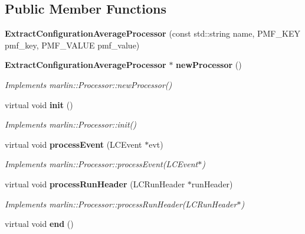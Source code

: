 \subsection*{Public Member Functions}
\begin{DoxyCompactItemize}
\item 
{\bfseries Extract\-Configuration\-Average\-Processor} (const std\-::string name, P\-M\-F\-\_\-\-K\-E\-Y pmf\-\_\-key, P\-M\-F\-\_\-\-V\-A\-L\-U\-E pmf\-\_\-value)\label{classCALICE_1_1ExtractConfigurationAverageProcessor_a8035f64050859ba76161f1432b37b457}

\item 
{\bf Extract\-Configuration\-Average\-Processor} $\ast$ {\bf new\-Processor} ()\label{classCALICE_1_1ExtractConfigurationAverageProcessor_a077ce7a15806f9843796b912eb8fbce7}

\begin{DoxyCompactList}\small\item\em Implements marlin\-::\-Processor\-::new\-Processor() \end{DoxyCompactList}\item 
virtual void {\bf init} ()\label{classCALICE_1_1ExtractConfigurationAverageProcessor_a28b4116dd4ec68e02db2c9f2ee17fc74}

\begin{DoxyCompactList}\small\item\em Implements marlin\-::\-Processor\-::init() \end{DoxyCompactList}\item 
virtual void {\bf process\-Event} (L\-C\-Event $\ast$evt)\label{classCALICE_1_1ExtractConfigurationAverageProcessor_a7e74ff5efd13293e12977cd11787dbc7}

\begin{DoxyCompactList}\small\item\em Implements marlin\-::\-Processor\-::process\-Event(\-L\-C\-Event$\ast$) \end{DoxyCompactList}\item 
virtual void {\bf process\-Run\-Header} (L\-C\-Run\-Header $\ast$run\-Header)\label{classCALICE_1_1ExtractConfigurationAverageProcessor_a3549b7175d1d32b2103f25ead4f5a5fa}

\begin{DoxyCompactList}\small\item\em Implements marlin\-::\-Processor\-::process\-Run\-Header(\-L\-C\-Run\-Header$\ast$) \end{DoxyCompactList}\item 
virtual void {\bf end} ()\label{classCALICE_1_1ExtractConfigurationAverageProcessor_a877b167e8302d7330d3b2a595ed0e824}


\end{DoxyCompactItemize}
